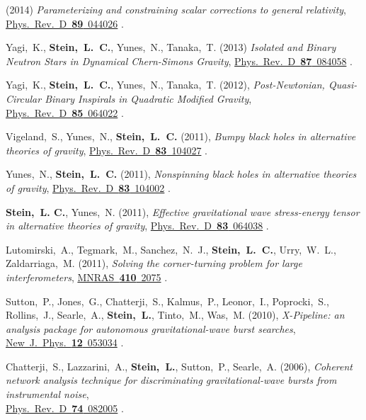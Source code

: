 \begin{etaremune}[start=\value{pubCounter}]
  (2014)
  {\it Parameterizing and constraining scalar corrections to general relativity},
  \href{http://dx.doi.org/10.1103/PhysRevD.89.044026}{Phys.~Rev.~D~{\bf 89}~044026}
  .
\item
  Yagi,~K., {\bf Stein,~L.~C.}, Yunes,~N., Tanaka,~T.
  (2013)
  {\it Isolated and Binary Neutron Stars in Dynamical Chern-Simons Gravity},
  \href{http://dx.doi.org/10.1103/PhysRevD.87.084058}{Phys.~Rev.~D~{\bf 87}~084058}
  .
\item
  Yagi,~K., {\bf Stein,~L.~C.}, Yunes,~N., Tanaka,~T.
  (2012),
  {\it Post-Newtonian, Quasi-Circular Binary Inspirals in Quadratic Modified Gravity},
  \href{http://dx.doi.org/10.1103/PhysRevD.85.064022}{Phys.~Rev.~D~{\bf 85}~064022}
  .
\item
  Vigeland,~S., Yunes,~N., {\bf Stein,~L.~C.}
  (2011),
  {\it Bumpy black holes in alternative theories of gravity},
  \href{http://dx.doi.org/10.1103/PhysRevD.83.104027}{Phys.~Rev.~D~{\bf 83}~104027}
  .
\item
  Yunes,~N., {\bf Stein,~L.~C.}
  (2011),
  {\it Nonspinning black holes in alternative theories of gravity},
  \href{http://dx.doi.org/10.1103/PhysRevD.83.104002}{Phys.~Rev.~D~{\bf 83}~104002}
  .
\item
  {\bf Stein,~L. C.}, Yunes,~N.
  (2011),
  {\it Effective gravitational wave stress-energy tensor in
    alternative theories of gravity},
  \href{http://dx.doi.org/10.1103/PhysRevD.83.064038}{Phys.~Rev.~D~{\bf 83}~064038}
  .
\item
  Lutomirski,~A., Tegmark,~M., Sanchez,~N.~J., {\bf
    Stein,~L.~C.}, Urry,~W.~L., Zaldarriaga,~M.
  (2011),
  {\it Solving the corner-turning problem for large interferometers},
  \href{http://dx.doi.org/10.1111/j.1365-2966.2010.17587.x}{MNRAS~{\bf 410}~2075}
  .
\item
  Sutton,~P., Jones,~G., Chatterji,~S., Kalmus,~P., Leonor,~I.,
  Poprocki,~S., Rollins,~J., Searle,~A., {\bf Stein,~L.}, Tinto,~M.,
  Was,~M.
  (2010),
  {\it X-Pipeline: an analysis package for autonomous
    gravitational-wave burst searches},
  \href{http://dx.doi.org/10.1088/1367-2630/12/5/053034}{New~J.~Phys.~{\bf 12}~053034}
  .
\item
  Chatterji,~S., Lazzarini,~A., {\bf Stein,~L.}, Sutton,~P.,
  Searle,~A.
  (2006),
  {\it Coherent network analysis technique for
    discriminating gravitational-wave bursts from instrumental noise},\\
  \href{http://dx.doi.org/10.1103/PhysRevD.74.082005}{Phys.~Rev.~D~{\bf 74}~082005}
  .
  \setcounter{pubCounter}{\value{enumi}}
\end{etaremune}

